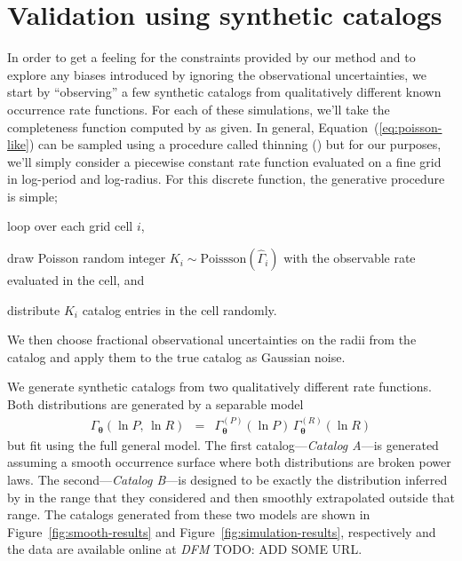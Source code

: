 \documentclass[12pt,preprint]{aastex}
\newcommand{\figref}[1]{\ref{fig:#1}}
\newcommand{\Fig}[1]{Figure~\figref{#1}}
\newcommand{\fig}[1]{\Fig{#1}}
\newcommand{\Eq}[1]{Equation~(\ref{eq:#1})}
\newcommand{\eq}[1]{\Eq{#1}}
\newcommand{\sectlabel}[1]{\label{sect:#1}}
\newcommand{\bvec}[1]{\ensuremath{\boldsymbol{#1}}}
\newcommand{\todo}[3]{{\color{#2} \emph{#1} TODO: #3}}
\newcommand{\dfmtodo}[1]{\todo{DFM}{red}{#1}}
\newcommand{\rate}{\ensuremath{\Gamma}}
\newcommand{\ratepar}{{\ensuremath{\theta}}}
\newcommand{\ratepars}{{\ensuremath{\bvec{\ratepar}}}}
\newcommand{\obs}[1]{\ensuremath{\hat{#1}}}
\newcommand{\radius}{\ensuremath{R}}
\newcommand{\period}{\ensuremath{P}}
\newcommand{\modela}{\emph{Catalog A}}
\newcommand{\modelb}{\emph{Catalog B}}
\begin{document}
\section{Validation using synthetic catalogs}
\sectlabel{valid}

In order to get a feeling for the constraints provided by our method and to
explore any biases introduced by ignoring the observational uncertainties, we
start by ``observing'' a few synthetic catalogs from qualitatively different
known occurrence rate functions.
For each of these simulations, we'll take the completeness function computed
by \citet{petigura} as given.
In general, \eq{poisson-like} can be sampled using a procedure called thinning
(\citealt{poisson}) but for our purposes, we'll simply consider a piecewise
constant rate function evaluated on a fine grid in log-period and log-radius.
For this discrete function, the generative procedure is simple;
\begin{enumerate}
{\item loop over each grid cell $i$,}
{\item draw Poisson random integer $K_i\sim\mathrm{Poissson}(\obs{\rate}_i)$
with the observable rate evaluated in the cell, and}
{\item distribute $K_i$ catalog entries in the cell randomly.}
\end{enumerate}
We then choose fractional observational uncertainties on the radii from the
\citet{petigura} catalog and apply them to the true catalog as Gaussian noise.

We generate synthetic catalogs from two qualitatively different rate
functions.
Both distributions are generated by a separable model
\begin{eqnarray}
\rate_\ratepars (\ln\period,\,\ln\radius) &=&
    \rate_\ratepars^{(\period)}(\ln\period)\,
    \rate_\ratepars^{(\radius)}(\ln\radius)
\end{eqnarray}
but fit using the full general model.
The first catalog---\modela---is generated assuming a smooth occurrence
surface where both distributions are broken power laws.
The second---\modelb---is designed to be exactly the distribution inferred by
\citet{petigura} in the range that they considered and then smoothly
extrapolated outside that range.
The catalogs generated from these two models are shown in \fig{smooth-results}
and \fig{simulation-results}, respectively and the data are available online
at \dfmtodo{ADD SOME URL}.
\end{document}
